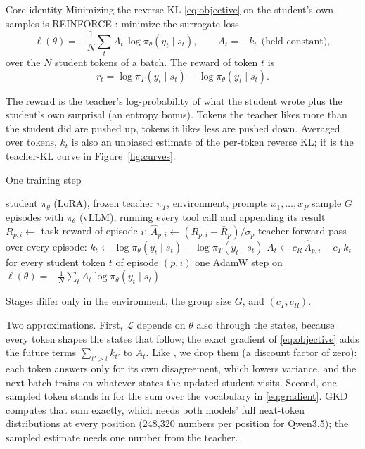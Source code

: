 \documentclass[11pt,a4paper]{article}
\newcommand{\pis}{\pi_\theta}
\newcommand{\pit}{\pi_T}
\begin{document}
\begin{keybox}{Core identity}
Minimizing the reverse KL \eqref{eq:objective} on the student's own samples
is REINFORCE \citep{williams1992reinforce}: minimize the surrogate loss
\begin{equation}
  \ell(\theta) = -\frac{1}{N}\sum_{t} A_t\,\log\pis(y_t\mid s_t),
  \qquad A_t = -k_t \ \ \text{(held constant)},
  \label{eq:loss}
\end{equation}
over the $N$ student tokens of a batch. The reward of token $t$ is
\begin{equation}
  r_t = \log\pit(y_t\mid s_t) - \log\pis(y_t\mid s_t).
  \label{eq:reward}
\end{equation}
\end{keybox}

The reward is the teacher's log-probability of what the student wrote plus
the student's own surprisal (an entropy bonus). Tokens the teacher likes
more than the student did are pushed up, tokens it likes less are pushed
down. Averaged over tokens, $k_t$ is also an unbiased estimate of the
per-token reverse KL; it is the teacher-KL curve in Figure~\ref{fig:curves}.

\begin{algobox}[label=alg:step]{One training step}
\begin{algorithmic}[1]
\Require student $\pis$ (LoRA), frozen teacher $\pit$, environment,
  prompts $x_1,\dots,x_P$
  \State sample $G$ episodes with $\pis$ (vLLM), running every tool call and
    appending its result
  \State $R_{p,i}\gets$ task reward of episode $i$;\quad
    $\hat A_{p,i}\gets(R_{p,i}-\bar R_p)/\sigma_p$
\EndFor
\State teacher forward pass over every episode:
  $k_t\gets\log\pis(y_t\mid s_t)-\log\pit(y_t\mid s_t)$
\State $A_t\gets c_R\,\hat A_{p,i}-c_T\,k_t$ for every student token $t$ of
  episode $(p,i)$
\State one AdamW step on
  $\ell(\theta)=-\frac{1}{N}\sum_t A_t\log\pis(y_t\mid s_t)$
\end{algorithmic}
\smallskip
{\small\color{wr-taupe}Stages differ only in the environment, the group size
$G$, and $(c_T, c_R)$.}
\end{algobox}

\begin{notebox}{Two approximations.}
First, $\mathcal{L}$ depends on $\theta$ also through the states, because
every token shapes the states that follow; the exact gradient of
\eqref{eq:objective} adds the future terms $\sum_{t'>t}k_{t'}$ to $A_t$.
Like \citet{lu2025onpolicy}, we drop them (a discount factor of zero): each
token answers only for its own disagreement, which lowers variance, and the
next batch trains on whatever states the updated student visits. Second, one
sampled token stands in for the sum over the vocabulary in
\eqref{eq:gradient}. GKD \citep{agarwal2024gkd} computes that sum exactly,
which needs both models' full next-token distributions at every position
(248{,}320 numbers per position for Qwen3.5); the sampled estimate needs one
number from the teacher.
\end{notebox}
\end{document}
